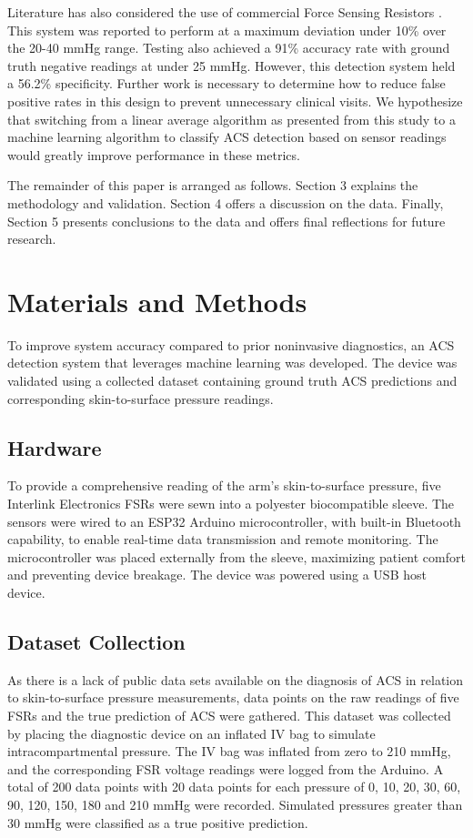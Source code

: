 \documentclass[times, twoside]{zHenriquesLab-StyleBioRxiv}
\begin{document}
Literature has also considered the use of commercial Force Sensing Resistors \cite{ferrari2019sensei}. This system was reported to perform at a maximum deviation under 10\% over the 20-40 mmHg range. Testing also achieved a 91\% accuracy rate with ground truth negative readings at under 25 mmHg. However, this detection system held a 56.2\% specificity. Further work is necessary to determine how to reduce false positive rates in this design to prevent unnecessary clinical visits. We hypothesize that switching from a linear average algorithm as presented from this study to a machine learning algorithm to classify ACS detection based on sensor readings would greatly improve performance in these metrics.

The remainder of this paper is arranged as follows. Section 3 explains the methodology and validation.  Section 4 offers a discussion on the data. Finally, Section 5 presents conclusions to the data and offers final reflections for future research.
\section*{Materials and Methods}
To improve system accuracy compared to prior noninvasive diagnostics, an ACS detection system that leverages machine learning was developed. The device was validated using a collected dataset containing ground truth ACS predictions and corresponding skin-to-surface pressure readings.
\subsection*{Hardware} To provide a comprehensive reading of the arm’s skin-to-surface pressure, five Interlink Electronics FSRs were sewn into a polyester biocompatible sleeve. The sensors were wired to an ESP32 Arduino microcontroller, with built-in Bluetooth capability, to enable real-time data transmission and remote monitoring. The microcontroller was placed externally from the sleeve, maximizing patient comfort and preventing device breakage. The device was powered using a USB host device.

\subsection*{Dataset Collection}
As there is a lack of public data sets available on the diagnosis of ACS in relation to skin-to-surface pressure measurements, data points on the raw readings of five FSRs and the true prediction of ACS were gathered. This dataset was collected by placing the diagnostic device on an inflated IV bag to simulate intracompartmental pressure. The IV bag was inflated from zero to 210 mmHg, and the corresponding FSR voltage readings were logged from the Arduino. A total of 200 data points with 20 data points for each pressure of 0, 10, 20, 30, 60, 90, 120, 150, 180 and 210 mmHg were recorded. Simulated pressures greater than 30 mmHg were classified as a true positive prediction. 
\end{document}
